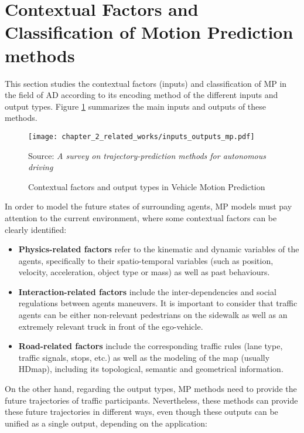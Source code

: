 \section{Contextual Factors and Classification of Motion Prediction methods}
\label{sec:2_contextual_factors_and_classification_mp}

This section studies the contextual factors (inputs) and classification of \ac{MP} in the field of \ac{AD} according to its encoding method of the different inputs and output types. Figure \ref{fig:chapter_2_related_works/input_output_mp} summarizes the main inputs and outputs of these methods. 

\begin{figure}[h]
	\centering
	\texttt{[image: chapter\_2\_related\_works/inputs\_outputs\_mp.pdf]}
	\caption{Contextual factors and output types in Vehicle Motion Prediction}
	Source: \textit{A survey on trajectory-prediction methods for autonomous driving} \cite{huang2022survey}
	\label{fig:chapter_2_related_works/input_output_mp}
\end{figure}

In order to model the future states of surrounding agents, \ac{MP} models must pay attention to the current environment, where some contextual factors can be clearly identified:

\begin{itemize}
	
	\item \textbf{Physics-related factors} refer to the kinematic and dynamic variables of the agents, specifically to their spatio-temporal variables (such as position, velocity, acceleration, object type or mass) as well as past behaviours. 
	
	\item \textbf{Interaction-related factors} include the inter-dependencies and social regulations between agents maneuvers. It is important to consider that traffic agents can be either non-relevant pedestrians on the sidewalk as well as an extremely relevant truck in front of the ego-vehicle.
	
	\item \textbf{Road-related factors} include the corresponding traffic rules (lane type, traffic signals, stops, etc.) as well as the modeling of the map (usually \ac{HDmap}), including its topological, semantic and geometrical information.
	
\end{itemize}

On the other hand, regarding the output types, \ac{MP} methods need to provide the future trajectories of traffic participants. Nevertheless, these methods can provide these future trajectories in different ways, even though these outputs can be unified as a single output, depending on the application:

